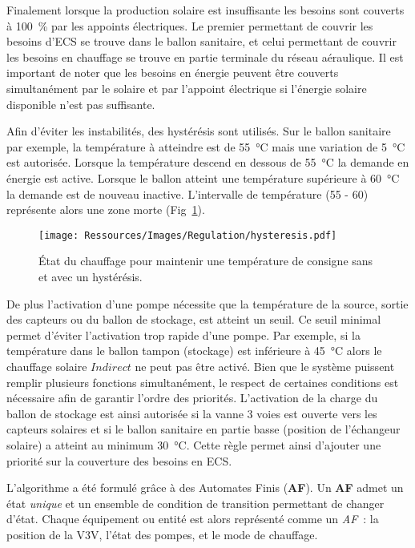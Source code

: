 Finalement lorsque la production solaire est insuffisante les besoins sont couverts à
\SI{100}{\percent} par les appoints électriques. Le premier permettant de couvrir les
besoins d’ECS se trouve dans le ballon sanitaire, et celui permettant de couvrir les
besoins en chauffage se trouve en partie terminale du réseau aéraulique. Il est important
de noter que les besoins en énergie peuvent être couverts simultanément par
le solaire et par l’appoint électrique si l’énergie solaire disponible n’est pas
suffisante.

Afin d’éviter les instabilités, des hystérésis sont utilisés. Sur le ballon sanitaire par
exemple, la température à atteindre est de \SI{55}{\celsius} mais une variation de
\SI{5}{\celsius} est autorisée. Lorsque la température descend en dessous de
\SI{55}{\celsius} la demande en énergie est active. Lorsque le ballon atteint une
température supérieure à \SI{60}{\celsius} la demande est de nouveau inactive.
L’intervalle de température (55 - 60) représente alors une zone morte (Fig~\ref{fig:hysteresis}).
\begin{figure}
    \begin{center}
        \texttt{[image: Ressources/Images/Regulation/hysteresis.pdf]}
    \end{center}
    \caption{État du chauffage pour maintenir une température de consigne sans
             et avec un hystérésis.
             \label{fig:hysteresis}}
\end{figure}

De plus l’activation d’une pompe nécessite que la température de la source, sortie des
capteurs ou du ballon de stockage, est atteint un seuil. Ce seuil minimal permet d’éviter
l’activation trop rapide d’une pompe. Par exemple, si la température dans le ballon tampon
(stockage) est inférieure à \SI{45}{\celsius} alors le chauffage solaire $Indirect$ ne
peut pas être activé. Bien que le système puissent remplir plusieurs fonctions
simultanément, le respect de certaines conditions est nécessaire afin de garantir l’ordre
des priorités. L’activation de la charge du ballon de stockage est ainsi autorisée si la
vanne 3 voies est ouverte vers les capteurs solaires et si le ballon sanitaire en partie
basse (position de l’échangeur solaire) a atteint au minimum \SI{30}{\celsius}. Cette
règle permet ainsi d’ajouter une priorité sur la couverture des besoins en ECS.

L’algorithme a été formulé grâce à des Automates Finis (\textbf{AF}). Un \textbf{AF}
admet un état \emph{unique} et un ensemble de condition de transition permettant
de changer d’état. Chaque équipement ou entité est alors représenté comme un \emph{AF}~: la
position de la V3V, l’état des pompes, et le mode de chauffage.


